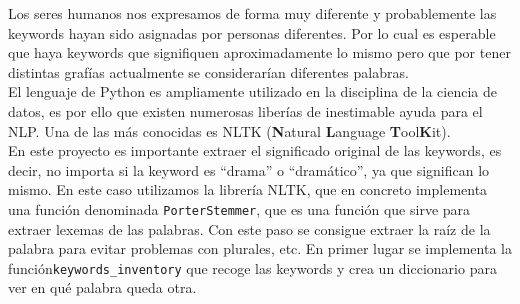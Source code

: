 Los seres humanos nos expresamos de forma muy diferente y probablemente las keywords hayan sido asignadas por personas diferentes. Por lo cual es esperable que haya keywords que signifiquen aproximadamente lo mismo pero que por tener distintas grafías actualmente se considerarían diferentes palabras.\\

El lenguaje de Python es ampliamente utilizado en la disciplina de la ciencia de datos, es por ello que existen numerosas liberías de inestimable ayuda para el NLP. Una de las más conocidas es NLTK \cite{NLTK} (\textbf{N}atural \textbf{L}anguage \textbf{T}ool\textbf{K}it).\\

En este proyecto es importante extraer el significado original de las keywords, es decir, no importa si la keyword es ``drama'' o ``dramático'', ya que significan lo mismo. En este caso utilizamos la librería NLTK, que en concreto implementa una función denominada \texttt{PorterStemmer}\cite{porter}, que es una función que sirve para extraer lexemas de las palabras. Con este paso se consigue extraer la raíz de la palabra para evitar problemas con plurales, etc. En primer lugar se implementa la función\texttt{keywords\_inventory} que recoge las keywords y crea un diccionario para ver en qué palabra queda otra.

